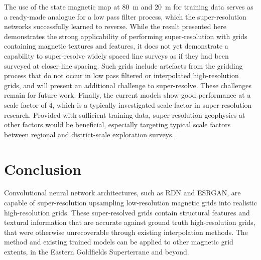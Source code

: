 The use of the state magnetic map at \qty{80}{\metre} and \qty{20}{\metre} for training data serves as a ready-made analogue for a low pass filter process, which the super-resolution networks successfully learned to reverse.
While the result presented here demonstrates the strong applicability of performing super-resolution with grids containing magnetic textures and features, it does not yet demonstrate a capability to super-resolve widely spaced line surveys as if they had been surveyed at closer line spacing.
Such grids include artefacts from the gridding process that do not occur in low pass filtered or interpolated high-resolution grids, and will present an additional challenge to super-resolve.
These challenges remain for future work.
Finally, the current models show good performance at a scale factor of \num{4}, which is a typically investigated scale factor in super-resolution research.
Provided with sufficient training data, super-resolution geophysics at other factors would be beneficial, especially targeting typical scale factors between regional and district-scale exploration surveys.

\section{Conclusion}
Convolutional neural network architectures, such as RDN and ESRGAN, are capable of super-resolution upsampling low-resolution magnetic grids into realistic high-resolution grids.
These super-resolved grids contain structural features and textural information that are accurate against ground truth high-resolution grids, that were otherwise unrecoverable through existing interpolation methods.
The method and existing trained models can be applied to other magnetic grid extents, in the Eastern Goldfields Superterrane and beyond.




% 